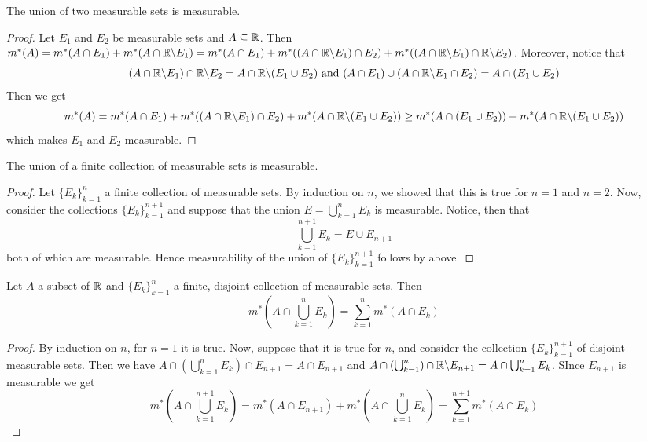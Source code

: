\begin{lemma}\label{2.2.3}
    The union of two measurable sets is measurable.
\end{lemma}
\begin{proof}
    Let $E_1$ and $E_2$ be measurable sets and $A \subseteq \mathbb{R}$. Then
    $m^\ast(A)=m^\ast(A \cap E_1)+m^\ast(A \cap \mathbb{R}\backslash E_1)=m^\ast(A \cap
    E_1)+m^\ast((A \cap \mathbb{R}\backslash E_1) \cap E_2)+m^\ast((A \cap \mathbb{R}\backslash E_1)
    \cap \mathbb{R}\backslash E_2)$. Moreover, notice that
    \begin{equation*}
        (A \cap \mathbb{R}\backslash E_1) \cap \mathbb{R}\backslash E_2=A \cap \mathbb{R}\backslash(E_1 \cup E_2)
        \text{ and }
        (A \cap E_1) \cup (A \cap \mathbb{R}\backslash E_1 \cap E_2)=A \cap (E_1 \cup E_2)
    \end{equation*}
    Then we get
    \begin{equation*}
        m^\ast(A)=m^\ast(A \cap E_1)+m^\ast((A \cap \mathbb{R}\backslash E_1) \cap
        E_2)+m^\ast(A \cap \mathbb{R}\backslash(E_1 \cup E_2))
        \geq m^\ast(A \cap (E_1 \cup E_2))+m^\ast(A \cap \mathbb{R}\backslash(E_1 \cup E_2))
    \end{equation*}
    which makes $E_1$ and $E_2$ measurable.
\end{proof}
\begin{corollary}
    The union of a finite collection of measurable sets is measurable.
\end{corollary}
\begin{proof}
    Let $\{E_k\}_{k=1}^n$ a finite collection of measurable sets. By induction
    on $n$, we showed that this is true for  $n=1$ and  $n=2$. Now, consider the
    collections  $\{E_k\}_{k=1}^{n+1}$ and suppose that the union
    $E=\bigcup_{k=1}^n{E_k}$ is measurable. Notice, then that
    \begin{equation*}
        \bigcup_{k=1}^{n+1}{E_k}=E \cup E_{n+1}
    \end{equation*}
    both of which are measurable. Hence measurability of the union of
    $\{E_k\}_{k=1}^{n+1}$ follows by above.
\end{proof}

\begin{lemma}\label{2.2.4}
    Let $A$ a subset of  $\mathbb{R}$ and  $\{E_k\}_{k=1}^n$ a finite, disjoint
    collection of measurable sets. Then
    \begin{equation*}
        m^\ast(A \cap \bigcup_{k=1}^n{E_k})=\sum_{k=1}^n{m^\ast(A \cap E_k)}
    \end{equation*}
\end{lemma}
\begin{proof}
    By induction on $n$, for  $n=1$ it is true. Now, suppose that it is true for
     $n$, and consider the collection  $\{E_k\}_{k=1}^{n+1}$ of disjoint
     measurable sets. Then we have $A \cap (\bigcup_{k=1}^n{E_k}) \cap E_{n+1}=A
     \cap E_{n+1}$ and $A \cap (\bigcup_{k=1}^n) \cap \mathbb{R}\backslash E_{n+1}=A \cap
     \bigcup_{k=1}^n{E_k}$. SInce $E_{n+1}$ is measurable we get
     \begin{equation*}
         m^\ast(A \cap \bigcup_{k=1}^{n+1}{E_k})=m^\ast(A \cap E_{n+1})+m^\ast(A
         \cap \bigcup_{k=1}^n{E_k})=\sum_{k=1}^{n+1}{m^\ast(A \cap E_k)}
     \end{equation*}
\end{proof}

